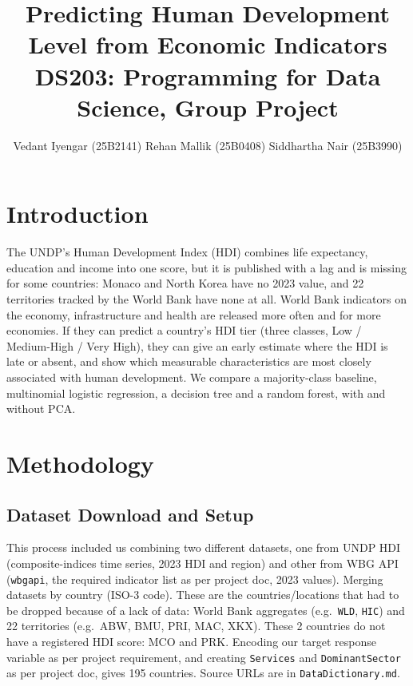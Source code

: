 \documentclass[11pt,a4paper]{article}
\title{\vspace{-1.5cm}\textbf{Predicting Human Development Level from Economic Indicators}\\
\large DS203: Programming for Data Science, Group Project}
\author{\normalsize Vedant Iyengar (25B2141) \quad Rehan Mallik (25B0408)
  \quad Siddhartha Nair (25B3990)}
\date{\vspace{-0.6cm}}
\renewcommand{\_}{\oldus\allowbreak}
\begin{document}
\maketitle

\section{Introduction}

The UNDP's Human Development Index (HDI) combines life expectancy, education
and income into one score, but it is published with a lag and is missing for
some countries: Monaco and North Korea have no 2023 value, and 22
territories tracked by the World Bank have none at all. World Bank
indicators on the economy, infrastructure and health are released more
often and for more economies. If they can predict a country's HDI tier
(three classes, Low / Medium-High / Very High), they can give an early
estimate where the HDI is late or absent, and show which measurable
characteristics are most closely associated with human development. We
compare a majority-class baseline, multinomial logistic regression, a
decision tree and a random forest, with and without PCA.

\section{Methodology}

\subsection{Dataset Download and Setup}

This process included us combining two different datasets, one from UNDP
HDI (composite-indices time series, 2023
HDI and region) and other from WBG API (\texttt{wbgapi}, the required
indicator list as per project doc, 2023 values). Merging
datasets by country (ISO-3 code). These are the countries/locations that had
to be dropped because of a lack of data: World Bank aggregates
(e.g.\ \texttt{WLD}, \texttt{HIC}) and 22 territories (e.g.\ ABW, BMU, PRI,
MAC, XKX). These 2 countries do not have a registered HDI\_2023 score: MCO
and PRK. Encoding our target response variable as per project requirement,
and creating \texttt{Services} and \texttt{Dominant\_Sector} as per project
doc, gives 195 countries. Source URLs are in \texttt{Data\_Dictionary.md}.
\end{document}
